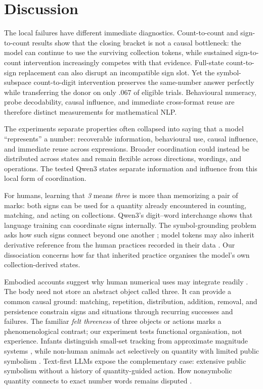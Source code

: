 \documentclass[11pt]{article}
\begin{document}
\section{Discussion}


The local failures have different immediate diagnostics. Count-to-count and
sign-to-count results show that the closing bracket is not a causal
bottleneck: the model can continue to use the surviving collection tokens,
while sustained sign-to-count intervention increasingly competes with that
evidence. Full-state count-to-sign replacement can also disrupt an
incompatible sign slot. Yet the symbol-subspace count-to-digit intervention
preserves the same-number answer perfectly while transferring the donor on
only .067 of eligible trials. Behavioural numeracy, probe decodability, causal
influence, and immediate cross-format reuse are therefore distinct
measurements for mathematical NLP.


The experiments separate properties often collapsed into saying that a model
``represents'' a number: recoverable information, behavioural use, causal
influence, and immediate reuse across expressions. Broader coordination could
instead be distributed across states and remain flexible across directions,
wordings, and operations. The tested Qwen3 states separate information and
influence from this local form of coordination.


For humans, learning that \emph{3} means \emph{three} is more than memorizing
a pair of marks: both signs can be used for a quantity already encountered in
counting, matching, and acting on collections. Qwen3's digit--word interchange
shows that language training can coordinate signs internally. The
symbol-grounding problem asks how such signs connect beyond one another
\citep{harnad1990symbol}; model tokens may also inherit derivative reference
from the human practices recorded in their data \citep{mandelkern2024refer}.
Our dissociation concerns how far that inherited practice organises the
model's own collection-derived states.


Embodied accounts suggest why human numerical uses may integrate readily
\citep{lakoff2000where,winter2020metaphor}. The body need not store an
abstract object called three. It can provide a common causal ground: matching,
repetition, distribution, addition, removal, and persistence constrain signs
and situations through recurring successes and failures. The familiar
\emph{felt threeness} of three objects or actions marks a phenomenological
contrast; our experiment tests functional organisation, not experience.
Infants distinguish small-set tracking from approximate magnitude systems
\citep{feigenson2004core}, while non-human animals act selectively on quantity
with limited public symbolism \citep{nieder2021neuroethology}. Text-first LLMs
expose the complementary case: extensive public symbolism without a history
of quantity-guided action. How nonsymbolic quantity connects to exact number
words remains disputed \citep{leibovich2016symbol}.
\end{document}
